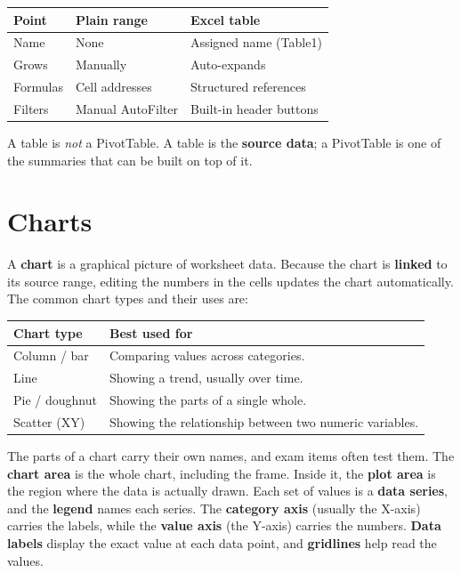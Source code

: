 \begin{center}
\begin{tabular}{lll}
\toprule
\textbf{Point} & \textbf{Plain range} & \textbf{Excel table} \\
\midrule
Name & None & Assigned name (Table1) \\
Grows & Manually & Auto-expands \\
Formulas & Cell addresses & Structured references \\
Filters & Manual AutoFilter & Built-in header buttons \\
\bottomrule
\end{tabular}
\end{center}

A table is \emph{not} a PivotTable. A table is the \textbf{source data}; a
PivotTable is one of the summaries that can be built on top of it.

\section{Charts}
A \textbf{chart} is a graphical picture of worksheet data. Because the chart is
\textbf{linked} to its source range, editing the numbers in the cells updates
the chart automatically. The common chart types and their uses are:

\begin{center}
\begin{tabular}{p{}p{}}
\toprule
\textbf{Chart type} & \textbf{Best used for} \\
\midrule
Column / bar & Comparing values across categories. \\
Line & Showing a trend, usually over time. \\
Pie / doughnut & Showing the parts of a single whole. \\
Scatter (XY) & Showing the relationship between two numeric variables. \\
\bottomrule
\end{tabular}
\end{center}

The parts of a chart carry their own names, and exam items often test them. The
\textbf{chart area} is the whole chart, including the frame. Inside it, the
\textbf{plot area} is the region where the data is actually drawn. Each set of
values is a \textbf{data series}, and the \textbf{legend} names each series. The
\textbf{category axis} (usually the X-axis) carries the labels, while the
\textbf{value axis} (the Y-axis) carries the numbers. \textbf{Data labels}
display the exact value at each data point, and \textbf{gridlines} help read the
values.

